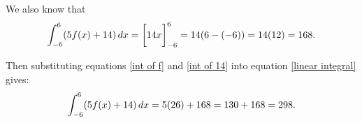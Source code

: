 \documentclass[nooutcomes]{ximera}
\begin{document}
\begin{problem}
\begin{enumerate}
\begin{freeResponse}
		We also know that
			\begin{equation}\label{int of 14}
			\int_{-6}^6 (5f(x) + 14) \,d x = \bigg[ 14x \bigg]_{-6}^6 = 14(6 - (-6)) = 14(12) = 168.
			\end{equation}
			
		Then substituting equations \eqref{int of f} and \eqref{int of 14} into equation \eqref{linear integral} gives:
			\begin{equation*}
			\int_{-6}^6 (5f(x) + 14) \,d x = 5(26) + 168 = 130 + 168 = 298.
			\end{equation*}
		\end{freeResponse}
		
		
		
	\end{enumerate}
		
		
\end{problem}
\end{document}
